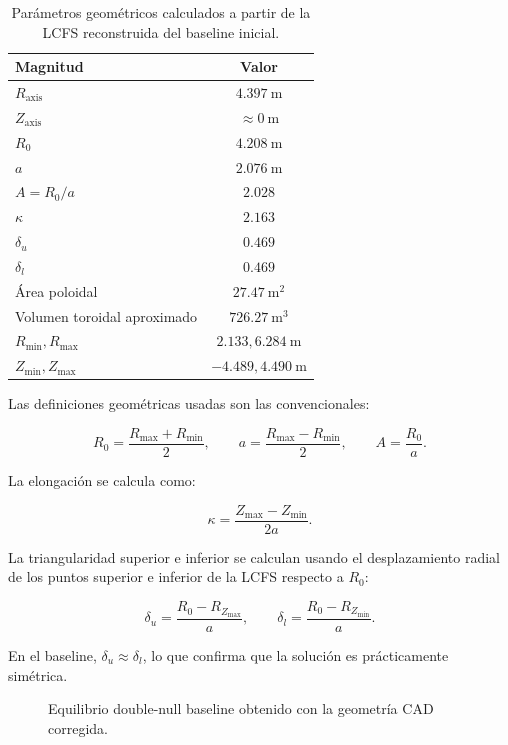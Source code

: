 \documentclass[11pt,a4paper]{article}
\begin{document}
\begin{table}[htbp]
\centering
\caption{Parámetros geométricos calculados a partir de la LCFS reconstruida del baseline inicial.}
\label{tab:baseline_geometry_detailed}
\begin{tabular}{lc}
\toprule
\textbf{Magnitud} & \textbf{Valor} \\
\midrule
$R_{\mathrm{axis}}$ & $4.397~\mathrm{m}$ \\
$Z_{\mathrm{axis}}$ & $\approx 0~\mathrm{m}$ \\
$R_0$ & $4.208~\mathrm{m}$ \\
$a$ & $2.076~\mathrm{m}$ \\
$A=R_0/a$ & $2.028$ \\
$\kappa$ & $2.163$ \\
$\delta_u$ & $0.469$ \\
$\delta_l$ & $0.469$ \\
Área poloidal & $27.47~\mathrm{m^2}$ \\
Volumen toroidal aproximado & $726.27~\mathrm{m^3}$ \\
$R_{\min},R_{\max}$ & $2.133,6.284~\mathrm{m}$ \\
$Z_{\min},Z_{\max}$ & $-4.489,4.490~\mathrm{m}$ \\
\bottomrule
\end{tabular}
\end{table}

Las definiciones geométricas usadas son las convencionales:

\[
R_0 = \frac{R_{\max}+R_{\min}}{2}, \qquad
 a = \frac{R_{\max}-R_{\min}}{2}, \qquad
 A = \frac{R_0}{a}.
\]

La elongación se calcula como:

\[
\kappa = \frac{Z_{\max}-Z_{\min}}{2a}.
\]

La triangularidad superior e inferior se calculan usando el desplazamiento radial de los puntos
superior e inferior de la LCFS respecto a $R_0$:

\[
\delta_u = \frac{R_0 - R_{Z_{\max}}}{a},\qquad
\delta_l = \frac{R_0 - R_{Z_{\min}}}{a}.
\]

En el baseline, $\delta_u\approx\delta_l$, lo que confirma que la solución es prácticamente
simétrica.

\begin{figure}[htbp]
\centering
{}
\caption{Equilibrio double-null baseline obtenido con la geometría CAD corregida.}
\label{fig:baseline_equilibrium_clean_placeholder}
\end{figure}
\end{document}
